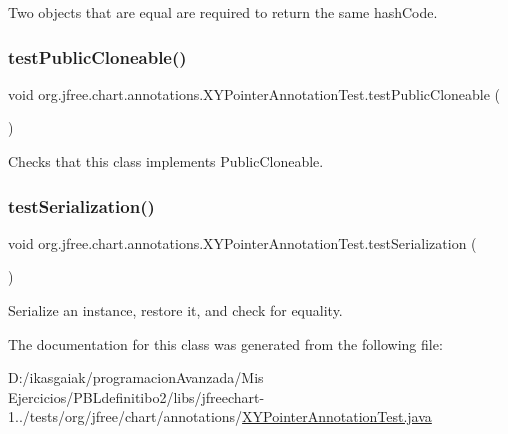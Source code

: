 Two objects that are equal are required to return the same hash\+Code. \mbox{\label{classorg_1_1jfree_1_1chart_1_1annotations_1_1_x_y_pointer_annotation_test_a44d14e91a1afa939b18c5bea31a9ed6b}} 
\subsubsection{\texorpdfstring{test\+Public\+Cloneable()}{testPublicCloneable()}}
{\footnotesize\ttfamily void org.\+jfree.\+chart.\+annotations.\+X\+Y\+Pointer\+Annotation\+Test.\+test\+Public\+Cloneable (\begin{DoxyParamCaption}{ }\end{DoxyParamCaption})}

Checks that this class implements Public\+Cloneable. \mbox{\label{classorg_1_1jfree_1_1chart_1_1annotations_1_1_x_y_pointer_annotation_test_a6eab193bc6937640860519a3dd65c684}} 
\subsubsection{\texorpdfstring{test\+Serialization()}{testSerialization()}}
{\footnotesize\ttfamily void org.\+jfree.\+chart.\+annotations.\+X\+Y\+Pointer\+Annotation\+Test.\+test\+Serialization (\begin{DoxyParamCaption}{ }\end{DoxyParamCaption})}

Serialize an instance, restore it, and check for equality. 

The documentation for this class was generated from the following file\+:\begin{DoxyCompactItemize}
\item 
D\+:/ikasgaiak/programacion\+Avanzada/\+Mis Ejercicios/\+P\+B\+Ldefinitibo2/libs/jfreechart-\/1../tests/org/jfree/chart/annotations/\mbox{\hyperlink{_x_y_pointer_annotation_test_8java}{X\+Y\+Pointer\+Annotation\+Test.\+java}}\end{DoxyCompactItemize}
